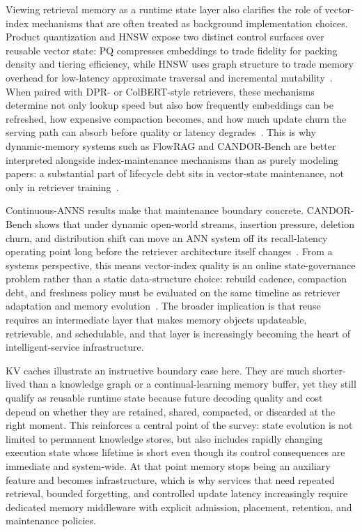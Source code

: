 \documentclass[acmsmall,screen,review]{acmart}
\begin{document}
Viewing retrieval memory as a runtime state layer also clarifies the role of vector-index mechanisms that are often treated as background implementation choices. Product quantization and HNSW expose two distinct control surfaces over reusable vector state: PQ compresses embeddings to trade fidelity for packing density and tiering efficiency, while HNSW uses graph structure to trade memory overhead for low-latency approximate traversal and incremental mutability~\cite{jegou2011pq,malkov2020hnsw}. When paired with DPR- or ColBERT-style retrievers, these mechanisms determine not only lookup speed but also how frequently embeddings can be refreshed, how expensive compaction becomes, and how much update churn the serving path can absorb before quality or latency degrades~\cite{karpukhin2020dpr,khattab2020colbert}. This is why dynamic-memory systems such as FlowRAG and CANDOR-Bench are better interpreted alongside index-maintenance mechanisms than as purely modeling papers: a substantial part of lifecycle debt sits in vector-state maintenance, not only in retriever training~\cite{zhang2026flowrag,wang2026candor}.

Continuous-ANNS results make that maintenance boundary concrete. CANDOR-Bench shows that under dynamic open-world streams, insertion pressure, deletion churn, and distribution shift can move an ANN system off its recall-latency operating point long before the retriever architecture itself changes~\cite{wang2026candor}. From a systems perspective, this means vector-index quality is an online state-governance problem rather than a static data-structure choice: rebuild cadence, compaction debt, and freshness policy must be evaluated on the same timeline as retriever adaptation and memory evolution~\cite{zhang2026flowrag,wang2026candor}. The broader implication is that reuse requires an intermediate layer that makes memory objects updateable, retrievable, and schedulable, and that layer is increasingly becoming the heart of intelligent-service infrastructure.

KV caches illustrate an instructive boundary case here. They are much shorter-lived than a knowledge graph or a continual-learning memory buffer, yet they still qualify as reusable runtime state because future decoding quality and cost depend on whether they are retained, shared, compacted, or discarded at the right moment. This reinforces a central point of the survey: state evolution is not limited to permanent knowledge stores, but also includes rapidly changing execution state whose lifetime is short even though its control consequences are immediate and system-wide. At that point memory stops being an auxiliary feature and becomes infrastructure, which is why services that need repeated retrieval, bounded forgetting, and controlled update latency increasingly require dedicated memory middleware with explicit admission, placement, retention, and maintenance policies.
\end{document}
